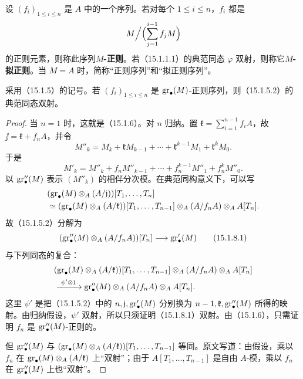 设 $(f_i)_{1\leq i\leq n}$ 是 $A$ 中的一个序列。若对每个 $1\leq i\leq n$，$f_i$ 都是
\[
 M\Big/\Bigl(\sum_{j=1}^{i-1}f_jM\Bigr)
\]
的正则元素，则称此序列\textbf{$M$-正则}。若（15.1.1.1）的典范同态 $\varphi$ 双射，则称它\textbf{$M$-拟正则}。当 $M=A$ 时，简称“正则序列”和“拟正则序列”。

采用（15.1.5）的记号。若 $(f_i)_{1\leq i\leq n}$ 是 $\operatorname{gr}_\bullet(M)$-正则序列，则（15.1.5.2）的典范同态双射。
\begin{proof}
当 $n=1$ 时，这就是（15.1.6）。对 $n$ 归纳。置 $\mathfrak k=\sum_{i=1}^{n-1}f_iA$，故 $\jj=\mathfrak k+f_nA$，并令
\[
 M''_k=M_k+\mathfrak kM_{k-1}+\cdots+\mathfrak k^{k-1}M_1+\mathfrak k^kM_0.
\]
于是
\[
 M'_k=M''_k+f_nM''_{k-1}+\cdots+f_n^{k-1}M''_1+f_n^kM''_0.
\]
以 $\operatorname{gr}''_\bullet(M)$ 表示 $(M''_k)$ 的相伴分次模。在典范同构意义下，可以写
\[
\begin{split}
 &(\operatorname{gr}_\bullet(M)\otimes_A(A/\mathfrak j))[T_1,\ldots,T_n]\\
 &\simeq
 (\operatorname{gr}_\bullet(M)\otimes_A(A/\mathfrak k))[T_1,\ldots,T_{n-1}]
 \otimes_A(A/f_nA)\otimes_A A[T_n].
\end{split}
\]
故（15.1.5.2）分解为
\begin{equation}
 (\operatorname{gr}''_\bullet(M)\otimes_A(A/f_nA))[T_n]
 \longrightarrow\operatorname{gr}'_\bullet(M)
 \tag{15.1.8.1}
\end{equation}
与下列同态的复合：
\[
\begin{split}
 &(\operatorname{gr}_\bullet(M)\otimes_A(A/\mathfrak k))[T_1,\ldots,T_{n-1}]
       \otimes_A(A/f_nA)\otimes_A A[T_n]\\
 &\xrightarrow{\ \psi'\otimes1\ }
 \operatorname{gr}''_\bullet(M)\otimes_A(A/f_nA)\otimes_A A[T_n].
\end{split}
\]
这里 $\psi'$ 是把（15.1.5.2）中的 $n,\mathfrak j,\operatorname{gr}'_\bullet(M)$ 分别换为 $n-1,\mathfrak k,\operatorname{gr}''_\bullet(M)$ 所得的映射。由归纳假设，$\psi'$ 双射，所以只须证明（15.1.8.1）双射。由（15.1.6），只需证明 $f_n$ 是 $\operatorname{gr}''_\bullet(M)$-正则的。

但 $\operatorname{gr}''_\bullet(M)$ 与 $(\operatorname{gr}_\bullet(M)\otimes_A(A/\mathfrak k))[T_1,\ldots,T_{n-1}]$ 等同。原文写道：由假设，乘以 $f_n$ 在 $\operatorname{gr}_\bullet(M)\otimes_A(A/\mathfrak k)$ 上“双射”；由于 $A[T_1,\ldots,T_{n-1}]$ 是自由 $A$-模，乘以 $f_n$ 在 $\operatorname{gr}''_\bullet(M)$ 上也“双射”。
\end{proof}


